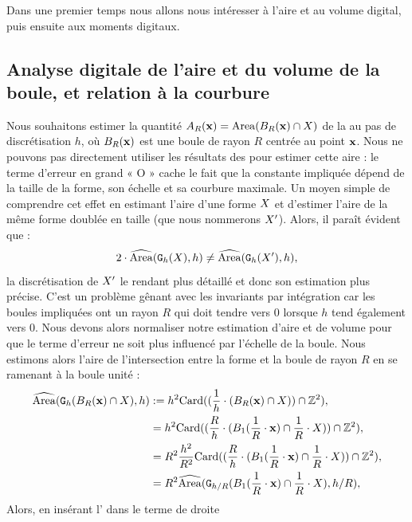 Dans une premier temps nous allons nous intéresser à l'aire et au volume
digital, puis ensuite aux moments digitaux.
%
\subsection{Analyse digitale de l'aire et du volume de la boule, et relation à la courbure}
\label{sec:ii-2d}
%
Nous souhaitons estimer la quantité $A_R(\vx) = \Area(\Ball{R}{\vx}\cap\Shape)$ de la
 au pas de discrétisation $h$, où $\Ball{R}{\vx}$ est une
boule de rayon $R$ centrée au point $\vx$. Nous ne pouvons pas directement
utiliser les résultats des
 pour estimer cette
aire : le terme d'erreur en grand « O » cache le fait que la constante impliquée
dépend de la taille de la forme, son échelle et sa courbure maximale. Un moyen
simple de comprendre cet effet en estimant l'aire d'une forme $\Shape$ et
d'estimer l'aire de la même forme doublée en taille (que nous nommerons
$\Shape'$). Alors, il paraît évident que :
%
\begin{equation}
  2 \cdot \AreaC(\DSh,h) \ne \AreaC(\DigF{\Shape'}{h},h),
\end{equation}
%
la discrétisation de $\Shape'$ le rendant plus détaillé et donc son estimation
plus précise. C'est un problème gênant avec les invariants par intégration car
les boules impliquées ont un rayon $R$ qui doit tendre vers $0$ lorsque $h$ tend
également vers $0$. Nous devons alors normaliser notre estimation d'aire et de
volume pour que le terme d'erreur ne soit plus influencé par l'échelle de la
boule. Nous estimons alors l'aire de l'intersection entre la forme et la boule
de rayon $R$ en se ramenant à la boule unité :
%
\begin{align}
  \AreaC(\DigF{\Ball{R}{\vx} \cap \Shape}{h}, h) & \EqDef h^2 \MCard( ( \frac{1}{h} \cdot ( \Ball{R}{\vx} \cap \Shape ) ) \cap \Z^2 ), \\
   & = h^2 \MCard( (\frac{R}{h} \cdot ( \Ball{1}{\frac{1}{R} \cdot \vx} \cap \frac{1}{R} \cdot \Shape) ) \cap \Z^2 ), \\
   & = R^2 \frac{h^2}{R^2} \MCard( (\frac{R}{h} \cdot ( \Ball{1}{\frac{1}{R} \cdot \vx} \cap \frac{1}{R} \cdot \Shape) ) \cap \Z^2 ), \\
   & = R^2 \AreaC( \DigF{\Ball{1}{\frac{1}{R} \cdot \vx} \cap \frac{1}{R} \cdot \Shape}{h/R}, h/R ), \label{eq:Area_unitary_ball}
\end{align}
%
Alors, en insérant l' dans le terme de droite
